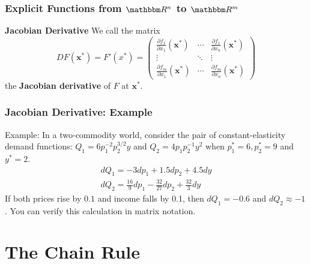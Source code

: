 \documentclass[9pt,aspectratio=169]{beamer}
\newcommand{\RR}{\mathbbm R}
\begin{document}
\begin{frame}
	\frametitle{Explicit Functions from $\RR^n$ to $\RR^m$}
	\begin{block}{\textbf{Jacobian Derivative}}
		We call the matrix  
		$$ DF(\mathbf{x}^*) = F'(x^*) =  \left(\begin{array}{ccc}
                \frac{\partial f_1}{\partial x_1}(\mathbf{x^*}) & \cdots & \frac{\partial f_1}{\partial x_n}(\mathbf{x^*}) \\
                \vdots & \ddots & \vdots \\
                \frac{\partial f_m}{\partial x_1}(\mathbf{x^*})& \cdots &
                \frac{\partial f_m}{\partial x_n}(\mathbf{x^*})
		\end{array}
		\right) $$ 
		the \textbf{Jacobian derivative} of $F$ at $\mathbf{x^*}$.
	\end{block}
\end{frame}

\begin{frame}
	\frametitle{Jacobian Derivative: Example} Example: In a two-commodity
    world, consider the pair of constant-elasticity demand functions: $Q_1 =
    6p_1^{-2}p_2^{3/2}y$ and $Q_2 = 4p_1p_2^{-1}y^2$ when $p_1^* = 6, p_2^* =
    9$ and $y^* = 2$.
	\begin{align}
	dQ_1 = -3dp_1+1.5dp_2+4.5dy \nonumber \\
	dQ_2 = \frac{16}{9}dp_1-\frac{32}{27}dp_2+\frac{32}{3}dy \nonumber 
	\end{align}
	If both prices rise by $0.1$ and income falls by 0.1, then $dQ_1 = -0.6$
    and $dQ_2 \approx -1$. You can verify this calculation in matrix notation.
\end{frame}


\section{The Chain Rule}
\end{document}
